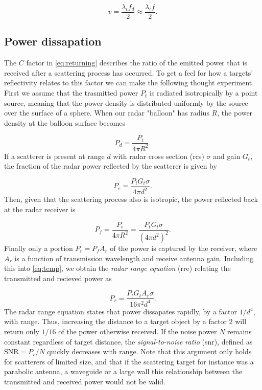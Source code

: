 \begin{equation}
	v = \frac{\lambda_t f_d}{2}
	\approx \frac{\lambda_t f}{2}.
\end{equation}


\subsection{Power dissapation}

The $C$ factor in \ref{eq:returning} describes the ratio of the emitted power that is received after a scattering process has occurred. To get a feel for how a targets' reflectivity relates to this factor we can make the following thought experiment. First we assume that the trasmitted power $P_t$ is radiated isotropically by a point source, meaning that the power density is distributed uniformly by the source over the surface of a sphere. When our radar "balloon" has radius $R$, the power density at the balloon surface becomes  \citep{amin_2017}

\begin{equation}
	P_d 
	= \frac{P_t}{4\pi R^2}.
\end{equation}
If a scatterer is present at range $d$ with radar cross section (\gls{rcs}) $\sigma$ and gain $G_t$, the fraction of the radar power reflected by the scatterer is given by 

\begin{equation}
	P_{e}
	= \frac{P_tG_t\sigma}{4\pi d^2}.
\end{equation}
Then, given that the scattering process also is isotropic, the power reflected back at the radar receiver is

\begin{equation}\label{eq:temp}
	P_f 
	= \frac{P_e}{4\pi R^2} 
	= \frac{P_t G_t \sigma}{(4\pi d^2)^2}.
\end{equation}
Finally only a portion $P_r = P_fA_r$ of the power is captured by the receiver, where $A_r$ is a function of transmission wavelength and receive antenna gain. Including this into \ref{eq:temp}, we obtain the \emph{radar range equation} (\gls{rre}) relating the transmitted and recieved power as

\begin{equation}
	P_r
	= \frac{P_t G_t A_r \sigma}{16\pi^2 d^4}.
\end{equation}
The radar range equation states that power dissapates rapidly, by a factor $1/d^4$, with range. Thus, increasing the distance to a target object by a factor 2 will return only $1/16$ of the power otherwise received. If the noise power $N$ remains constant regardless of target distance, the \emph{signal-to-noise ratio} (\gls{snr}), defined as $\text{SNR} = P_r/N$ quickly decreases with range. Note that this argument only holds for scatterers of limited size, and that if the scattering target for instance was a parabolic antenna, a waveguide or a large wall this relationship between the transmitted and received power would not be valid. 

